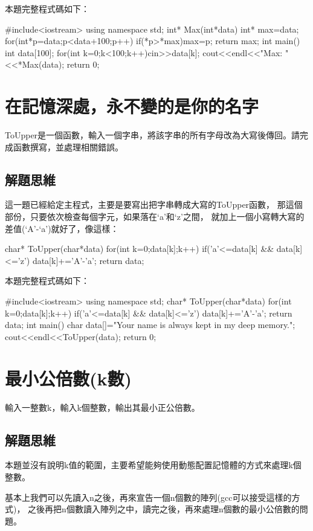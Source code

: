 本題完整程式碼如下：	
\begin{cppcode}
#include<iostream>
using namespace std;
int* Max(int*data){
	int* max=data; 
	for(int*p=data;p<data+100;p++) if(*p>*max)max=p;
	return max;
}
int main(){
	int data[100];
	for(int k=0;k<100;k++)cin>>data[k];
	cout<<endl<<"Max: "<<*Max(data);
	return 0;
}
\end{cppcode}


\section{在記憶深處，永不變的是你的名字}
ToUpper是一個函數，輸入一個字串，將該字串的所有字母改為大寫後傳回。請完成函數撰寫，並處理相關錯誤。

\subsection{解題思維}
這一題已經給定主程式，主要是要寫出把字串轉成大寫的ToUpper函數，
那這個部份，只要依次檢查每個字元，如果落在`a'和`z'之間，
就加上一個小寫轉大寫的差值(`A'-`a')就好了，像這樣：
\begin{inside}
char* ToUpper(char*data){
	for(int k=0;data[k];k++){
		if('a'<=data[k] && data[k]<='z') data[k]+='A'-'a';
	}
	return data;
}
\end{inside}

本題完整程式碼如下：	
\begin{cppcode}
#include<iostream>
using namespace std;
char* ToUpper(char*data){
	for(int k=0;data[k];k++){
		if('a'<=data[k] && data[k]<='z') data[k]+='A'-'a';
	}
	return data;
}
int main(){
	char data[]="Your name is always kept in my deep memory.";
	cout<<endl<<ToUpper(data);
	return 0;
}
\end{cppcode}


\section{最小公倍數(k數)}
輸入一整數k，輸入k個整數，輸出其最小正公倍數。

\subsection{解題思維}
本題並沒有說明k值的範圍，主要希望能夠使用動態配置記憶體的方式來處理k個整數。

基本上我們可以先讀入n之後，再來宣告一個n個數的陣列(gcc可以接受這樣的方式)，
之後再把n個數讀入陣列之中，讀完之後，再來處理n個數的最小公倍數的問題。

